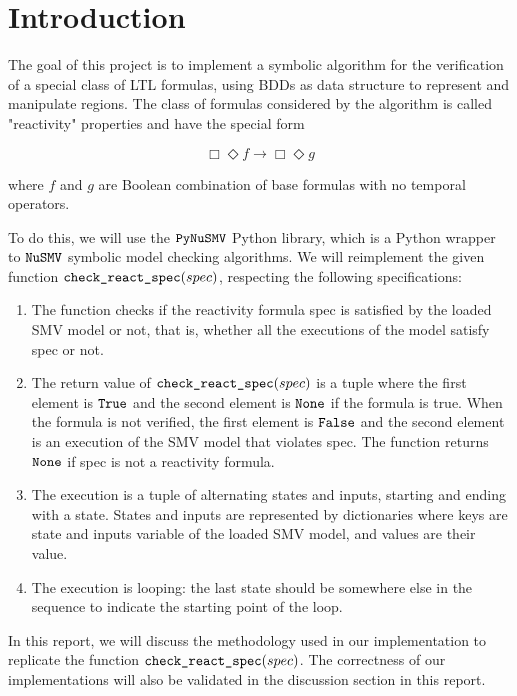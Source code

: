 \section{Introduction}

The goal of this project is to implement a symbolic algorithm for the verification of a special class of LTL formulas, using BDDs as data structure to represent and manipulate regions. The class of formulas considered by the algorithm is called "reactivity" properties and have the special form

\[ \Box\Diamond f \rightarrow \Box\Diamond g\]

where $f$ and $g$ are Boolean combination of base formulas with no temporal operators.

\medskip

To do this, we will use the $\verb|PyNuSMV|$ Python library, which is a Python wrapper to $\verb|NuSMV|$ symbolic model checking algorithms. We will reimplement the given function $\verb|check_react_spec|(spec)$, respecting the following specifications:

\begin{enumerate}
	\item The function checks if the reactivity formula spec is satisfied by the loaded SMV model or not, that is, whether all the executions of the model satisfy spec or not.
	\item The return value of $\verb|check_react_spec|(spec)$ is a tuple where the first element is $\verb|True|$ and the second element is $\verb|None|$ if the formula is true. When the formula is not verified, the first element is $\verb|False|$ and the second element is an execution of the SMV model that violates spec. The function returns $\verb|None|$ if spec is not a reactivity formula.
	\item The execution is a tuple of alternating states and inputs, starting and ending with a state. States and inputs are represented by dictionaries where keys are state and inputs variable of the loaded SMV model, and values are their value.
	\item The execution is looping: the last state should be somewhere else in the sequence to indicate the starting point of the loop. 
\end{enumerate}

\medskip

In this report, we will discuss the methodology used in our implementation to replicate the function $\verb|check_react_spec|(spec)$. The correctness of our implementations will also be validated in the discussion section in this report.

